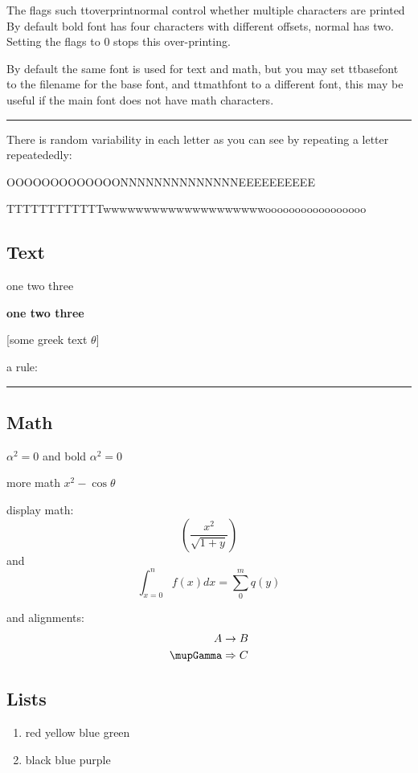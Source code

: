 \documentclass{article}
\begin{document}
The flags such ttoverprintnormal control whether multiple characters are printed
By default bold font has four characters with different offsets, normal has two.
Setting the flags to 0 stops this over-printing.

By default the same font is used for text and math, but you may set
ttbasefont to the filename for the base font, and
ttmathfont to a different font, this may be useful if the main font
does not have math characters.


\hrule

There is random variability in each letter as you can see by repeating
a letter repeatededly:

OOOOOOOOOOOOONNNNNNNNNNNNNNEEEEEEEEEE

TTTTTTTTTTTTwwwwwwwwwwwwwwwwwwwwooooooooooooooooo




\subsection{Text}

one two three

\textbf{one two three}

[some greek text $θ$]

a  rule: \rule{3cm}{1pt}

\subsection{Math}

$\alpha^2=0$ and bold {\boldmath $\alpha^2=0$}



more math $x^2-\cos θ$


display math:
\[\left(\frac{x^2}{\sqrt{1+y}}\right)\]
and
\[\int_{x=0}^n f(x) dx = \sum_0^m q(y)\]

and alignments:
\begin{align}
A &\rightarrow B\\
\mupGamma &\Rightarrow C
\end{align}


\subsection{Lists}

\begin{enumerate}
\item red yellow blue green
\item black blue purple
\end{enumerate}
\end{document}
